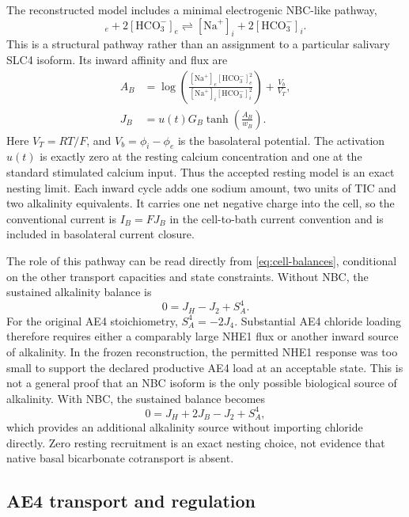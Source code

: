 \documentclass[11pt]{article}
\newcommand{\Na}{\mathrm{Na}^{+}}
\newcommand{\HCO}{\mathrm{HCO}_{3}^{-}}
\begin{document}
The reconstructed model includes a minimal electrogenic NBC-like pathway,
\begin{equation*}
    [\Na]_e+2[\HCO]_e \rightleftharpoons [\Na]_i+2[\HCO]_i.
\end{equation*}
This is a structural pathway rather than an assignment to a particular salivary SLC4 isoform. Its inward affinity and flux are
\begin{equation}
\begin{aligned}
    A_B&=\log\!\left(
       \frac{[\Na]_e[\HCO]_e^2}{[\Na]_i[\HCO]_i^2}
       \right)+\frac{V_b}{V_T},\\
    J_B&=u(t)G_B\tanh\!\left(\frac{A_B}{w_B}\right).
\end{aligned}
\label{eq:nbc}
\end{equation}
Here $V_T=RT/F$, and $V_b=\phi_i-\phi_e$ is the basolateral potential. The activation $u(t)$ is exactly zero at the resting calcium concentration and one at the standard stimulated calcium input. Thus the accepted resting model is an exact nesting limit. Each inward cycle adds one sodium amount, two units of TIC and two alkalinity equivalents. It carries one net negative charge into the cell, so the conventional current is $I_B=FJ_B$ in the cell-to-bath current convention and is included in basolateral current closure.

The role of this pathway can be read directly from \cref{eq:cell-balances}, conditional on the other transport capacities and state constraints. Without NBC, the sustained alkalinity balance is
\begin{equation*}
    0=J_H-J_2+S_A^4.
\end{equation*}
For the original AE4 stoichiometry, $S_A^4=-2J_4$. Substantial AE4 chloride loading therefore requires either a comparably large NHE1 flux or another inward source of alkalinity. In the frozen reconstruction, the permitted NHE1 response was too small to support the declared productive AE4 load at an acceptable state. This is not a general proof that an NBC isoform is the only possible biological source of alkalinity. With NBC, the sustained balance becomes
\begin{equation}
    0=J_H+2J_B-J_2+S_A^4,
    \label{eq:alkalinity-balance}
\end{equation}
which provides an additional alkalinity source without importing chloride directly. Zero resting recruitment is an exact nesting choice, not evidence that native basal bicarbonate cotransport is absent.

\subsection{AE4 transport and regulation}
\end{document}

